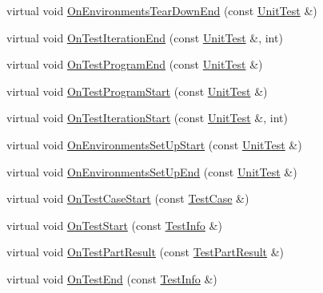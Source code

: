 \begin{DoxyCompactItemize}
\item 
virtual void \hyperlink{classtesting_1_1_empty_test_event_listener_aea64c83c415b33a4c0b0239bafd1438d}{On\-Environments\-Tear\-Down\-End} (const \hyperlink{classtesting_1_1_unit_test}{Unit\-Test} \&)
\item 
virtual void \hyperlink{classtesting_1_1_empty_test_event_listener_a2253e5a18b3cf7bccd349567a252209d}{On\-Test\-Iteration\-End} (const \hyperlink{classtesting_1_1_unit_test}{Unit\-Test} \&, int)
\item 
virtual void \hyperlink{classtesting_1_1_empty_test_event_listener_a0abcc02bd2331a2e29ad6f4d9daf2a32}{On\-Test\-Program\-End} (const \hyperlink{classtesting_1_1_unit_test}{Unit\-Test} \&)
\item 
virtual void \hyperlink{classtesting_1_1_empty_test_event_listener_aa3847c8a3c22d8d69a6006dfdd6589fc}{On\-Test\-Program\-Start} (const \hyperlink{classtesting_1_1_unit_test}{Unit\-Test} \&)
\item 
virtual void \hyperlink{classtesting_1_1_empty_test_event_listener_a836f05829855dc60d13ba99ad712c0dd}{On\-Test\-Iteration\-Start} (const \hyperlink{classtesting_1_1_unit_test}{Unit\-Test} \&, int)
\item 
virtual void \hyperlink{classtesting_1_1_empty_test_event_listener_a156d1965248fbdced6aabacadfa2d63f}{On\-Environments\-Set\-Up\-Start} (const \hyperlink{classtesting_1_1_unit_test}{Unit\-Test} \&)
\item 
virtual void \hyperlink{classtesting_1_1_empty_test_event_listener_abc481c6648d15d4242245195a06f5aa0}{On\-Environments\-Set\-Up\-End} (const \hyperlink{classtesting_1_1_unit_test}{Unit\-Test} \&)
\item 
virtual void \hyperlink{classtesting_1_1_empty_test_event_listener_ae4707ed9cc7ace5241bc8ccc4051209b}{On\-Test\-Case\-Start} (const \hyperlink{classtesting_1_1_test_case}{Test\-Case} \&)
\item 
virtual void \hyperlink{classtesting_1_1_empty_test_event_listener_a84fa74cc9ba742f9f847ea405ca84e5e}{On\-Test\-Start} (const \hyperlink{classtesting_1_1_test_info}{Test\-Info} \&)
\item 
virtual void \hyperlink{classtesting_1_1_empty_test_event_listener_a59e7f7d9f2e2d089a6e8c1e2577f4718}{On\-Test\-Part\-Result} (const \hyperlink{classtesting_1_1_test_part_result}{Test\-Part\-Result} \&)
\item 
virtual void \hyperlink{classtesting_1_1_empty_test_event_listener_afd58d21005f0d0d0399fb114627545d3}{On\-Test\-End} (const \hyperlink{classtesting_1_1_test_info}{Test\-Info} \&)

\end{DoxyCompactItemize}
